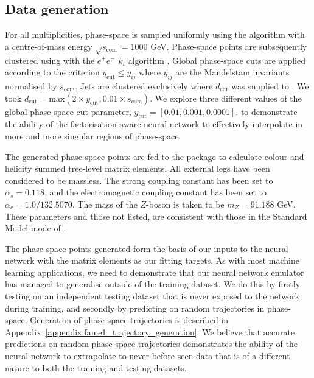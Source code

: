 \documentclass[main.tex]{subfiles}
\begin{document}
\subsection{Data generation}\label{sec:data}
For all multiplicities, phase-space is sampled uniformly using the {\RAMBO} algorithm \cite{Kleiss:1985gy} with a centre-of-mass energy $\sqrt{s_{\mathrm{com}}} = 1000$ GeV.
Phase-space points are subsequently clustered using {\FastJet} \cite{Cacciari:2011ma,noel_dawe_2021_4446849} with the $e^{+}e^{-}$ $k_{t}$ algorithm \cite{Catani:1991hj}.
Global phase-space cuts are applied according to the criterion $y_{\mathrm{cut}} \leq y_{ij}$ where $y_{ij}$ are the Mandelstam invariants normalised by $s_{\mathrm{com}}$.
Jets are clustered exclusively where $d_{\mathrm{cut}}$ was supplied to {\FastJet}. We took $d_{\mathrm{cut}} = \mathrm{max}(2 \times y_{\mathrm{cut}}, 0.01 \times s_{\mathrm{com}})$.
We explore three different values of the global phase-space cut parameter, $y_{\mathrm{cut}} = [0.01, 0.001, 0.0001]$, to demonstrate the ability of the factorisation-aware neural network to effectively interpolate in more and more singular regions of phase-space.

The generated phase-space points are fed to the {\NJet} package \cite{Badger:2012pg} to calculate colour and helicity summed tree-level matrix elements. 
All external legs have been considered to be massless. 
The strong coupling constant has been set to $\alpha_{s} = 0.118$, and the electromagnetic coupling constant has been set to $\alpha_{e} = 1.0 / 132.5070$.
The mass of the $Z$-boson is taken to be $m_{Z} = 91.188$ GeV.
These parameters and those not listed, are consistent with those in the Standard Model mode of \aNLO \cite{Alwall:2014hca}.

The phase-space points generated form the basis of our inputs to the neural network with the matrix elements as our fitting targets.
As with most machine learning applications, we need to demonstrate that our neural network emulator has managed to generalise outside of the training dataset.
We do this by firstly testing on an independent testing dataset that is never exposed to the network during training, and secondly by predicting on random trajectories in phase-space.
Generation of phase-space trajectories is described in Appendix~\ref{appendix:fame1_trajectory_generation}.
We believe that accurate predictions on random phase-space trajectories demonstrates the ability of the neural network to extrapolate to never before seen data 
that is of a different nature to both the training and testing datasets.
\end{document}
